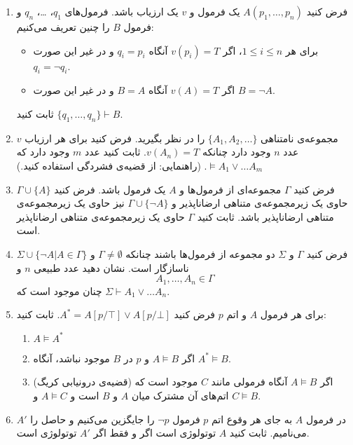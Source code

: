 \documentclass[12pt, 14paper]{article}
\begin{document}
\begin{enumerate}
\item
فرض کنید
$A(p_1,\ldots,p_n)$
یک فرمول و $v$ یک ارزیاب باشد. فرمول‌های $q_1$، \ldots، $q_n$ و فرمول $B$ را چنین تعریف می‌کنیم:
\begin{itemize}
\item
برای هر $1\leq i\leq n$، اگر $v(p_i)=T$ آنگاه $q_i=p_i$ و در غیر این صورت $q_i=\neg q_i$.

\item
اگر $v(A)=T$ آنگاه $B=A$ و در غیر این صورت $B=\neg A$.
\end{itemize}
ثابت کنید
$\{q_1,\ldots,q_n\}\vdash B$.

\item
مجموعه‌ی نامتناهی
$\{A_1,A_2,\ldots\}$
را در نظر بگیرید. فرض کنید برای هر ارزیاب $v$ عدد $n$ وجود دارد چنانکه $v(A_n)=T$. ثابت کنید عدد $m$ وجود دارد که
$\models A_1\vee\ldots A_m$.
(راهنمایی: از قضیه‌ی فشردگی استفاده کنید.)

\item
فرض کنید $\Gamma$ مجموعه‌ای از فرمول‌ها و $A$ یک فرمول باشد. فرض کنید $\Gamma\cup \{A\}$ حاوی یک زیرمجموعه‌ی متناهی ارضاناپذیر و $\Gamma\cup\{\neg A\}$ نیز حاوی یک زیرمجموعه‌ی متناهی ارضاناپذیر باشد. ثابت کنید $\Gamma$ حاوی یک زیرمجموعه‌ی متناهی ارضاناپذیر است.

\item
فرض کنید $\Gamma$ و $\Sigma$ دو مجموعه از فرمول‌ها باشند چنانکه $\Gamma\neq\emptyset$ و
$\Sigma\cup\{\neg A|A\in\Gamma\}$
ناسازگار است. نشان دهید عدد طبیعی $n$ و
$$
A_1,\ldots,A_n\in\Gamma
$$
چنان موجود است که
$\Sigma\vdash A_1\vee\ldots A_n$.

\item
برای هر فرمول $A$ و اتم $p$ فرض کنید
$A^*=A[p/\top]\vee A[p/\bot]$.
ثابت کنید:
\begin{enumerate}
\item
$A\models A^*$
\item
اگر
$A\models B$
و $p$ در $B$ موجود نباشد، آنگاه
$A^*\models B$.
\item
(قضیه‌ی درونیابی کریگ) اگر
$A\models B$
آنگاه فرمولی مانند $C$ موجود است که اتم‌های آن مشترک میان $A$ و $B$ است و $A\models C$ و $C\models B$.
\end{enumerate}

\item
در فرمول $A$ به جای هر وقوع اتم $p$ فرمول $\neg p$ را جایگزین می‌کنیم و حاصل را $A'$ می‌نامیم. ثابت کنید $A$ توتولوژی است اگر و فقط اگر $A'$ توتولوژی است.

\end{enumerate}
\end{document}
